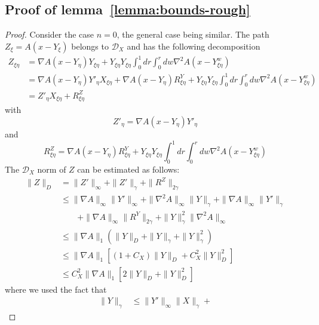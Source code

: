 \documentclass[a4paper,12pt,reqno]{amsart}
\newcommand{\norm}[1]{\|#1\|}
\newcommand{\DX}{\mathscr{D}_{X}}
\begin{document}
\subsection{Proof of lemma~\ref{lemma:bounds-rough}}
\label{sec:proof-bounds-rough}
\begin{proof}
Consider the case $n=0$, the general case being similar.
The path $Z_\xi = A(x-Y_\xi)$ belongs to $\DX$ and has the following
decomposition
\begin{equation*}
  \begin{split}
  Z_{\xi\eta}
& =  \nabla A(x-Y_\eta) Y_{\xi\eta} + Y_{\xi\eta} Y_{\xi\eta}
\int_0^1 dr \int_0^r dw \nabla^2 A(x-Y_{\xi\eta}^w)
\\& =  \nabla A(x-Y_\eta) Y'_\eta X_{\xi\eta}+ \nabla A(x-Y_\eta) R^Y_{\xi\eta} + Y_{\xi\eta} Y_{\xi\eta}
\int_0^1 dr \int_0^r dw \nabla^2 A(x-Y_{\xi\eta}^w)
\\ & = Z'_\eta X_{\xi\eta} + R^Z_{\xi\eta}
  \end{split}
 \end{equation*}
with
$$
Z'_\eta = \nabla A(x-Y_\eta) Y'_\eta
$$
and
$$
R^{Z}_{\xi\eta} = \nabla A(x-Y_\eta) R^Y_{\xi\eta} + Y_{\xi\eta} Y_{\xi\eta}
\int_0^1 dr \int_0^r dw \nabla^2 A(x-Y_{\xi\eta}^w)
$$
The $\DX$ norm of $Z$ can be estimated as follows:
\begin{equation}
\label{eq:boundzzz}
  \begin{split}
\norm{Z}_D & = \norm{Z'}_\infty + \norm{Z'}_\gamma +
\norm{R^Z}_{2\gamma}
\\ & \le \norm{\nabla A}_\infty \norm{Y'}_\infty + \norm{\nabla^2
  A}_\infty \norm{Y}_\gamma + \norm{\nabla A}_\infty \norm{Y'}_\gamma
\\ & \qquad + \norm{\nabla A}_\infty \norm{R^Y}_{2\gamma}+
\norm{Y}_\gamma^2 \norm{\nabla^2 A}_\infty
\\ & \le \norm{\nabla A}_1 (\norm{Y}_D + \norm{Y}_\gamma +
\norm{Y}^2_\gamma)
\\ & \le \norm{\nabla A}_1 [(1+C_X) \norm{Y}_D  +
C_X^2 \norm{Y}^2_D]
\\ & \le  C_X^2 \norm{\nabla A}_1 [2 \norm{Y}_D  +
 \norm{Y}^2_D]
  \end{split}
\end{equation}
where we used the fact that
\begin{equation}
  \label{eq:bound-gamma-D}
  \begin{split}
  \norm{Y}_\gamma & \le \norm{Y'}_\infty \norm{X}_\gamma +

\end{split}
\end{equation}
\end{proof}
\end{document}
